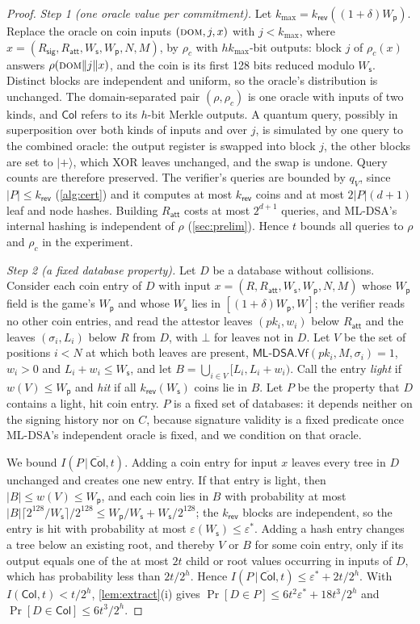 \documentclass[10pt,journal,compsoc]{IEEEtran}
\theoremstyle{tplain}
\theoremstyle{tdef}
\theoremstyle{remark}
\newcommand{\Ws}{W_{\mathsf{s}}}
\newcommand{\Wp}{W_{\mathsf{p}}}
\newcommand{\Rsig}{R_{\mathsf{sig}}}
\newcommand{\Ratt}{R_{\mathsf{att}}}
\newcommand{\kr}{k_{\mathsf{rev}}}
\newcommand{\mldsa}{\textsf{ML-DSA}}
\newcommand{\RO}{\rho}
\begin{document}
\begin{proof}
\emph{Step 1 (one oracle value per commitment).} Let $k_{\max}=\kr((1+\delta)\Wp)$. Replace the oracle on coin inputs $(\textsc{dom},j,x)$ with $j<k_{\max}$, where $x=(\Rsig,\Ratt,\Ws,\Wp,N,M)$, by $\RO_c$ with $hk_{\max}$-bit outputs: block $j$ of $\RO_c(x)$ answers $\RO(\textsc{dom}\|j\|x)$, and the coin is its first 128 bits reduced modulo $\Ws$. Distinct blocks are independent and uniform, so the oracle's distribution is unchanged. The domain-separated pair $(\RO,\RO_c)$ is one oracle with inputs of two kinds, and $\mathsf{Col}$ refers to its $h$-bit Merkle outputs. A quantum query, possibly in superposition over both kinds of inputs and over $j$, is simulated by one query to the combined oracle: the output register is swapped into block $j$, the other blocks are set to $\lvert+\rangle$, which XOR leaves unchanged, and the swap is undone. Query counts are therefore preserved. The verifier's queries are bounded by $q_V$, since $|P|\le\kr$ (\cref{alg:cert}) and it computes at most $\kr$ coins and at most $2|P|(d+1)$ leaf and node hashes. Building $\Ratt$ costs at most $2^{d+1}$ queries, and ML-DSA's internal hashing is independent of $\RO$ (\cref{sec:prelim}). Hence $t$ bounds all queries to $\RO$ and $\RO_c$ in the experiment.

\emph{Step 2 (a fixed database property).} Let $D$ be a database without collisions. Consider each coin entry of $D$ with input $x=(R,\Ratt,\Ws,\Wp,N,M)$ whose $\Wp$ field is the game's $\Wp$ and whose $\Ws$ lies in $[(1+\delta)\Wp,W]$; the verifier reads no other coin entries, and read the attestor leaves $(pk_i,w_i)$ below $\Ratt$ and the leaves $(\sigma_i,L_i)$ below $R$ from $D$, with $\bot$ for leaves not in $D$. Let $V$ be the set of positions $i<N$ at which both leaves are present, $\mldsa.\mathsf{Vf}(pk_i,M,\sigma_i)=1$, $w_i>0$ and $L_i+w_i\le\Ws$, and let $B=\bigcup_{i\in V}[L_i,L_i+w_i)$. Call the entry \emph{light} if $w(V)\le\Wp$ and \emph{hit} if all $\kr(\Ws)$ coins lie in $B$. Let $P$ be the property that $D$ contains a light, hit coin entry. $P$ is a fixed set of databases: it depends neither on the signing history nor on $C$, because signature validity is a fixed predicate once ML-DSA's independent oracle is fixed, and we condition on that oracle.

We bound $I(P\,|\,\overline{\mathsf{Col}},t)$. Adding a coin entry for input $x$ leaves every tree in $D$ unchanged and creates one new entry. If that entry is light, then $|B|\le w(V)\le\Wp$, and each coin lies in $B$ with probability at most $|B|\lceil2^{128}/\Ws\rceil/2^{128}\le\Wp/\Ws+\Ws/2^{128}$; the $\kr$ blocks are independent, so the entry is hit with probability at most $\varepsilon(\Ws)\le\varepsilon^\ast$. Adding a hash entry changes a tree below an existing root, and thereby $V$ or $B$ for some coin entry, only if its output equals one of the at most $2t$ child or root values occurring in inputs of $D$, which has probability less than $2t/2^h$. Hence $I(P\,|\,\overline{\mathsf{Col}},t)\le\varepsilon^\ast+2t/2^h$. With $I(\mathsf{Col},t)<t/2^h$, \cref{lem:extract}(i) gives $\Pr[D\in P]\le 6t^2\varepsilon^\ast+18t^3/2^h$ and $\Pr[D\in\mathsf{Col}]\le 6t^3/2^h$.


\end{proof}
\end{document}
